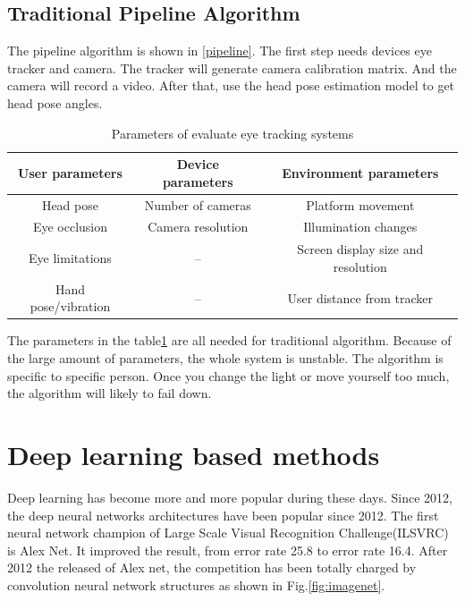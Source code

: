 \documentclass[senior]{IPSstyle}
\begin{document}
\subsection{Traditional Pipeline Algorithm}
\begin{center}\label{pipeline}
\end{center}
The pipeline algorithm is shown in \ref{pipeline}.
The first step needs devices eye tracker and camera.
The tracker will generate camera calibration matrix.
And the camera will record a video.
After that, use the head pose estimation model to get head pose angles.

\begin{table}[h]
    \centering
    \begin{tabular}{c|c|c}
         User parameters & Device parameters & Environment parameters \\ \hline
         Head pose & Number of cameras & Platform movement \\ 
         Eye occlusion & Camera resolution & Illumination changes \\
         Eye limitations & -- & Screen display size and resolution \\
         Hand pose/vibration & -- & User distance from tracker \\ 
    \end{tabular}
    \caption{Parameters of evaluate eye tracking systems}
    \label{tab:parameters}
\end{table}

The parameters in the table\ref{tab:parameters} are all needed for traditional algorithm.
Because of the large amount of parameters, the whole system is unstable.
The algorithm is specific to specific person.
Once you change the light or move yourself too much, the algorithm will likely to fail down.

\section{Deep learning based methods}
Deep learning has become more and more popular during these days.
Since 2012, the deep neural networks architectures have been popular since 2012.
The first neural network champion of Large Scale Visual Recognition Challenge(ILSVRC)\cite{ILSVRC15} is Alex Net.
It improved the result, from error rate 25.8 to error rate 16.4.
After 2012 the released of Alex net, the competition has been totally charged by convolution neural network structures as shown in Fig.\ref{fig:imagenet}.
\end{document}
